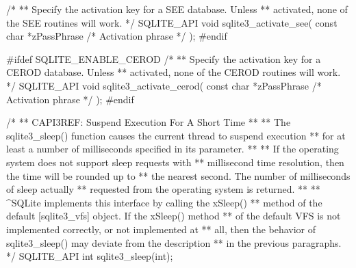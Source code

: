 \begin{Codex}[label=sqlite3.h,numbers=left]
{/*
** Specify the activation key for a SEE database.  Unless 
** activated, none of the SEE routines will work.
*/
SQLITE_API void sqlite3_activate_see(
  const char *zPassPhrase        /* Activation phrase */
);
#endif

#ifdef SQLITE_ENABLE_CEROD
/*
** Specify the activation key for a CEROD database.  Unless 
** activated, none of the CEROD routines will work.
*/
SQLITE_API void sqlite3_activate_cerod(
  const char *zPassPhrase        /* Activation phrase */
);
#endif

/*
** CAPI3REF: Suspend Execution For A Short Time
**
** The sqlite3_sleep() function causes the current thread to suspend execution
** for at least a number of milliseconds specified in its parameter.
**
** If the operating system does not support sleep requests with
** millisecond time resolution, then the time will be rounded up to
** the nearest second. The number of milliseconds of sleep actually
** requested from the operating system is returned.
**
** ^SQLite implements this interface by calling the xSleep()
** method of the default [sqlite3_vfs] object.  If the xSleep() method
** of the default VFS is not implemented correctly, or not implemented at
** all, then the behavior of sqlite3_sleep() may deviate from the description
** in the previous paragraphs.
*/
SQLITE_API int sqlite3_sleep(int);

}
\end{Codex}
